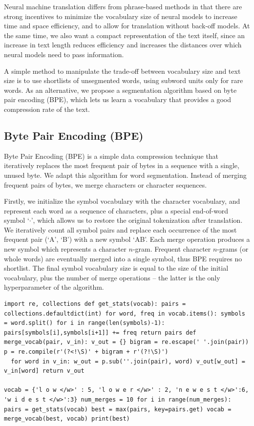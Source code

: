 Neural machine translation differs from phrase-based methods in that there are strong incentives to minimize the vocabulary size of neural models to increase time and space efficiency, and to allow for translation without back-off models. At the same time, we also want a compact representation of the text itself, since an increase in text length reduces efficiency and increases the distances over which neural models need to pass information.

A simple method to manipulate the trade-off between vocabulary size and text size is to use shortlists of unsegmented words, using subword units only for rare words. As an alternative, we propose a segmentation algorithm based on byte pair encoding (BPE), which lets us learn a vocabulary that provides a good compression rate of the text.

\subsection{Byte Pair Encoding (BPE)}

Byte Pair Encoding (BPE) \cite{Gage:1994:NAD:177910.177914} is a simple data compression technique that iteratively replaces the most frequent pair of bytes in a sequence with a single, unused byte. We adapt this algorithm for word segmentation. Instead of merging frequent pairs of bytes, we merge characters or character sequences.

Firstly, we initialize the symbol vocabulary with the character vocabulary, and represent each word as a sequence of characters, plus a special end-of-word symbol `$\cdot$', which allows us to restore the original tokenization after translation. We iteratively count all symbol pairs and replace each occurrence of the most frequent pair (`A', `B') with a new symbol `AB'. Each merge operation produces a new symbol which represents a character $n$-gram. Frequent character $n$-grams (or whole words) are eventually merged into a single symbol, thus BPE requires no shortlist. The final symbol vocabulary size is equal to the size of the initial vocabulary, plus the number of merge operations -- the latter is the only hyperparameter of the algorithm.

\begin{algorithm}
\begin{lstlisting}
import re, collections def get_stats(vocab): pairs = collections.defaultdict(int) for word, freq in vocab.items(): symbols = word.split() for i in range(len(symbols)-1): pairs[symbols[i],symbols[i+1]] += freq return pairs def merge_vocab(pair, v_in): v_out = {} bigram = re.escape(' '.join(pair)) p = re.compile(r'(?<!\S)' + bigram + r'(?!\S)')
  for word in v_in: w_out = p.sub(''.join(pair), word) v_out[w_out] = v_in[word] return v_out

vocab = {'l o w </w>' : 5, 'l o w e r </w>' : 2, 'n e w e s t </w>':6, 'w i d e s t </w>':3} num_merges = 10 for i in range(num_merges): pairs = get_stats(vocab) best = max(pairs, key=pairs.get) vocab = merge_vocab(best, vocab) print(best)
\end{lstlisting}
\caption{Learn BPE operations}
\label{bpe-algorithm}
\end{algorithm}

